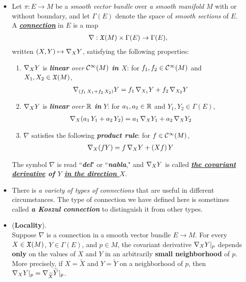 \documentclass[11pt]{article}
\begin{document}
\begin{itemize}
\item \begin{definition}
Let $\pi: E \rightarrow M$ be a \emph{smooth vector bundle} over \emph{a smooth manifold} $M$ with or without boundary, and let $\Gamma(E)$ denote the space of \emph{smooth sections} of $E$. A \underline{\emph{\textbf{connection}}} in $E$ is a map 
\begin{align*}
\nabla: {\mathfrak X}(M) \times \Gamma(E) \rightarrow \Gamma(E),
\end{align*} written $(X, Y) \mapsto \nabla_{X}{Y}$, satisfying the following properties:
\begin{enumerate}
\item $\nabla_{X}{Y}$ is \emph{\textbf{linear} over ${\mathcal C}^{\infty}(M)$ \textbf{in $X$}}: for $f_1, f_2 \in {\mathcal C}^{\infty}(M)$ and $X_1, X_2  \in {\mathfrak X}(M)$,
\begin{align*}
\nabla_{\left(f_1\,X_1 + f_2\,X_2\right)}{Y} &= f_1\,\nabla_{X_1}{Y} + f_2\,\nabla_{X_2}{Y}
\end{align*}
\item $\nabla_{X}{Y}$ is \emph{\textbf{linear} over ${\mathbb R}$ \textbf{in}} $Y$: for $a_1, a_2 \in {\mathbb R}$ and $Y_1, Y_2  \in \Gamma(E)$,
\begin{align*}
\nabla_{X}{\left(a_1\,Y_1 + a_2\,Y_2\right)} &= a_1\,\nabla_{X}{Y_1} + a_2\,\nabla_{X}{Y_2}
\end{align*}
\item $\nabla$ satisfies the following \emph{\textbf{product rule}}: for $f \in {\mathcal C}^{\infty}(M)$,
\begin{align*}
\nabla_{X}{(fY)} &= f\,\nabla_{X}{Y} + (Xf)\,Y
\end{align*}
\end{enumerate} 
The symbol $\nabla$ is read ``\emph{\textbf{del}}" or ``\emph{\textbf{nabla}}," and $\nabla_{X}{Y}$ is called \emph{\textbf{\underline{the covariant derivative} of $Y$ \underline{in the direction $X$}}}.
\end{definition}

\item \begin{remark}
There is \emph{a variety of types of connections} that are useful in different circumstances. The type of connection we have defined here is sometimes called \emph{\textbf{a Koszul connection}} to distinguish it from other types. 
\end{remark}

\item \begin{lemma} \label{lem: locality} (\textbf{Locality}). \citep{lee2018introduction}\\
Suppose $\nabla$ is a connection in a smooth vector bundle $E \rightarrow M$. For every $X \in {\mathfrak X}(M)$, $Y\in \Gamma(E)$, and $p \in M$, the covariant derivative $\nabla_{X}{Y}|_{p}$ depends \textbf{only} on the values of $X$ and $Y$ in an arbitrarily \textbf{small neighborhood} of $p$. More precisely, if $X = \widetilde{X}$ and $Y = \widetilde{Y}$ on a neighborhood of $p$, then $\nabla_{X}{Y}|_{p} = \nabla_{\widetilde{X}}{\widetilde{Y}}|_{p}$.
\end{lemma}


\end{itemize}
\end{document}
